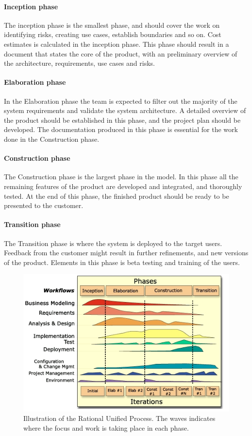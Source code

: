 \paragraph{Inception phase} The inception phase is the smallest phase, and should cover the work on identifying risks, creating use cases, establish boundaries and so on. Cost estimates is calculated in the inception phase. This phase should result in a document that states the core of the product, with an preliminary overview of the architecture, requirements, use cases and risks.

\paragraph{Elaboration phase} In the Elaboration phase the team is expected to filter out the majority of the system requirements and validate the system architecture. A detailed overview of the product should be established in this phase, and the project plan should be developed. The documentation produced in this phase is essential for the work done in the Construction phase.

\paragraph{Construction phase} The Construction phase is the largest phase in the model. In this phase all the remaining features of the product are developed and integrated, and thoroughly tested. At the end of this phase, the finished product should be ready to be presented to the customer.

\paragraph{Transition phase} The Transition phase is where the system is deployed to the target users. Feedback from the customer might result in further refinements, and new versions of the product. Elements in this phase is beta testing and training of the users.

\begin{figure}[H]
\centering
\includegraphics[scale=0.7]{images/rup.jpg}
\caption[Rational Unified process Model]{Illustration of the Rational Unified Process. The waves indicates where the focus and work is taking place in each phase.}
\label{fig:rup}
\end{figure}

